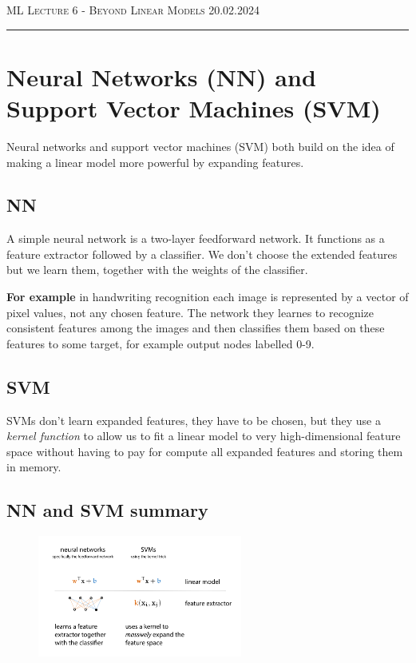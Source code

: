 \documentclass[12pt]{article}
\begin{document}
\thispagestyle{empty}

{\scshape ML } \hfill {\scshape \large Lecture 6 - Beyond Linear Models} \hfill {\scshape 20.02.2024}
 
\smallskip
\hrule
\bigskip

\tableofcontents

\section{Neural Networks (NN) and Support Vector Machines (SVM)}

Neural networks and support vector machines (SVM) both build on the idea of making a linear model more powerful by expanding features.

\subsection{NN}

A simple neural network is a two-layer feedforward network. It functions as a feature extractor followed by a classifier. We don't choose the extended features but we learn them, together with the weights of the classifier. \smallskip

\textbf{For example} in handwriting recognition each image is represented by a vector of pixel values, not any chosen feature. The network they learnes to recognize consistent features among the images and then classifies them based on these features to some target, for example output nodes labelled 0-9.


\subsection{SVM}

SVMs don't learn expanded features, they have to be chosen, but they use a \textit{kernel function} to allow us to fit a linear model to very high-dimensional feature space without having to pay for compute all expanded features and storing them in memory.

\subsection{NN and SVM summary}

\begin{figure}[!h]
    \centering
    \includegraphics[width=0.6\textwidth]{assets/svmandnn.png}
\end{figure}
\end{document}
